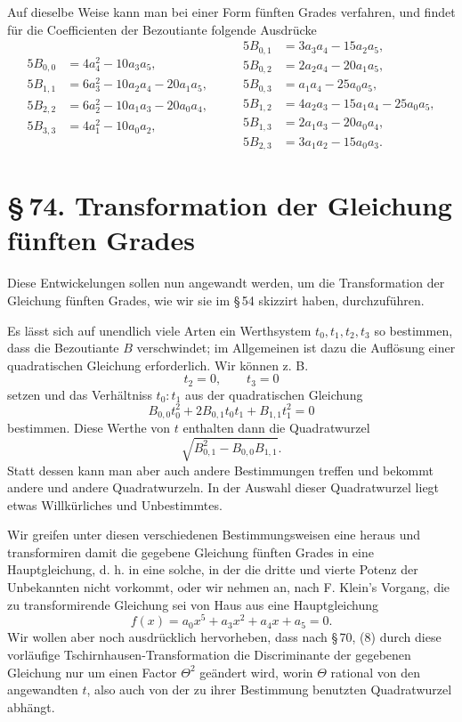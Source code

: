 \documentclass[11pt]{article}
\newcommand{\sect}[2]{\section*{\S\,#1. #2}}
\begin{document}
Auf dieselbe Weise kann man bei einer Form fünften Grades verfahren, und findet für die Coefficienten der Bezoutiante folgende Ausdrücke
\[
\begin{aligned}
5B_{0,0}&=4a_4^2-10a_3a_5,\\
5B_{1,1}&=6a_3^2-10a_2a_4-20a_1a_5,\\
5B_{2,2}&=6a_2^2-10a_1a_3-20a_0a_4,\\
5B_{3,3}&=4a_1^2-10a_0a_2,
\end{aligned}\qquad
\begin{aligned}
5B_{0,1}&=3a_3a_4-15a_2a_5,\\
5B_{0,2}&=2a_2a_4-20a_1a_5,\\
5B_{0,3}&=a_1a_4-25a_0a_5,\\
5B_{1,2}&=4a_2a_3-15a_1a_4-25a_0a_5,\\
5B_{1,3}&=2a_1a_3-20a_0a_4,\\
5B_{2,3}&=3a_1a_2-15a_0a_3.
\end{aligned}
\]

\sect{74}{Transformation der Gleichung fünften Grades}

Diese Entwickelungen sollen nun angewandt werden, um die Transformation der Gleichung fünften Grades, wie wir sie im \S\,54 skizzirt haben, durchzuführen.

Es lässt sich auf unendlich viele Arten ein Werthsystem $t_0,t_1,t_2,t_3$ so bestimmen, dass die Bezoutiante $B$ verschwindet; im Allgemeinen ist dazu die Auflösung einer quadratischen Gleichung erforderlich. Wir können z. B.
\[
 t_2=0,\qquad t_3=0
\]
setzen und das Verhältniss $t_0:t_1$ aus der quadratischen Gleichung
\[
 B_{0,0}t_0^2+2B_{0,1}t_0t_1+B_{1,1}t_1^2=0
\]
bestimmen. Diese Werthe von $t$ enthalten dann die Quadratwurzel
\[
 \sqrt{B_{0,1}^2-B_{0,0}B_{1,1}}.
\]
Statt dessen kann man aber auch andere Bestimmungen treffen und bekommt andere und andere Quadratwurzeln. In der Auswahl dieser Quadratwurzel liegt etwas Willkürliches und Unbestimmtes.

Wir greifen unter diesen verschiedenen Bestimmungsweisen eine heraus und transformiren damit die gegebene Gleichung fünften Grades in eine Hauptgleichung, d. h. in eine solche, in der die dritte und vierte Potenz der Unbekannten nicht vorkommt, oder wir nehmen an, nach F. Klein's Vorgang, die zu transformirende Gleichung sei von Haus aus eine Hauptgleichung
\begin{equation}
 f(x)=a_0x^5+a_3x^2+a_4x+a_5=0.
\tag{1}
\end{equation}
Wir wollen aber noch ausdrücklich hervorheben, dass nach \S\,70, (8) durch diese vorläufige Tschirnhausen-Transformation die Discriminante der gegebenen Gleichung nur um einen Factor $\Theta^2$ geändert wird, worin $\Theta$ rational von den angewandten $t$, also auch von der zu ihrer Bestimmung benutzten Quadratwurzel abhängt.
\end{document}
